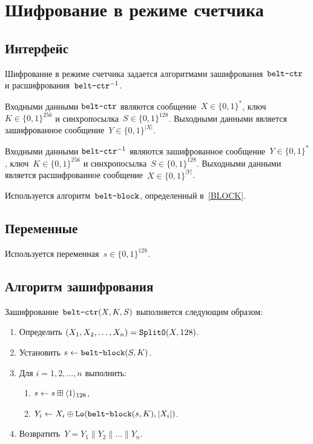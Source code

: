 \section{Шифрование в режиме счетчика}\label{CTR}

\subsection{Интерфейс}\label{CTR.IFace}

Шифрование в режиме счетчика задается алгоритмами 
зашифрования~$\texttt{belt-ctr}$ и расшифрования~$\texttt{belt-ctr}^{-1}$.

Входными данными $\texttt{belt-ctr}$ являются сообщение~$X\in\{0,1\}^*$, 
ключ~$K\in\{0,1\}^{256}$ и синхропосылка~$S\in\{0,1\}^{128}$.
%
Выходными данными является зашифрованное сообщение~$Y\in\{0,1\}^{|X|}$.

Входными данными $\texttt{belt-ctr}^{-1}$ являются зашифрованное 
сообщение~$Y\in\{0,1\}^*$, ключ~$K\in\{0,1\}^{256}$ и 
синхропосылка~$S\in\{0,1\}^{128}$. 
%
Выходными данными является расшифрованное сообщение~$X\in\{0,1\}^{|Y|}$.

Используется алгоритм~$\texttt{belt-block}$, определенный в~\ref{BLOCK}.

\subsection{Переменные}\label{CTR.Vars}

Используется переменная~$s\in\{0,1\}^{128}$.

\subsection{Алгоритм зашифрования}\label{CTR.Encr}

Зашифрование~$\texttt{belt-ctr}(X,K,S)$ выполняется следующим образом:
\begin{enumerate}
\item
Определить $(X_1,X_2,\ldots,X_n)=\mathop{\texttt{Split0}}\nolimits(X,128)$.
\item
Установить 
$s\leftarrow \texttt{belt-block}(S,K)$.
\item
Для $i=1,2,\ldots,n$ выполнить:
\begin{enumerate}
\item
$s\leftarrow s\boxplus\langle1\rangle_{128}$,
\item
$Y_i\leftarrow X_i\oplus\mathop{\texttt{Lo}}\nolimits(\texttt{belt-block}(s,K),|X_i|)$.
\end{enumerate}
\item
Возвратить~$Y=Y_1\parallel Y_2\parallel\ldots\parallel Y_n$.
\end{enumerate}

